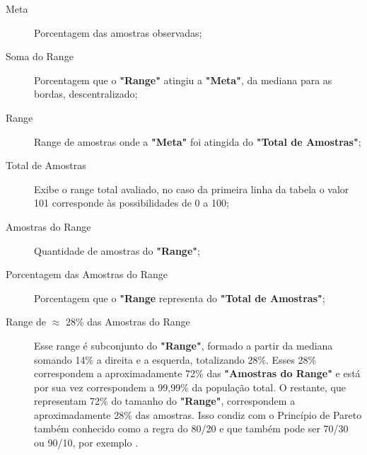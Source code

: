 \vspace{-8mm}
\begin{description}
   \item[Meta] Porcentagem das amostras observadas;
   \item[Soma do Range] Porcentagem que o \textbf{"Range"} atingiu a \textbf{"Meta"}, da mediana para as bordas, descentralizado;
   \item[Range] Range de amostras onde a \textbf{"Meta"} foi atingida do \textbf{"Total de Amostras"};
   \item[Total de Amostras] Exibe o range total avaliado, no caso da primeira linha da tabela o valor 101 corresponde às possibilidades de 0 a 100;
   \item[Amostras do Range] Quantidade de amostras do \textbf{"Range"};
   \item[Porcentagem das Amostras do Range] Porcentagem que o \textbf{"Range} representa do \textbf{"Total de Amostras"};
   \item[Range de $\approx$ 28\% das Amostras do Range] Esse range é  subconjunto do \textbf{"Range"}, formado a partir da mediana somando 14\% a direita e a esquerda, totalizando 28\%. Esses 28\% correspondem a aproximadamente 72\% das \textbf{"Amostras do Range"} e está por sua vez correspondem a 99,99\% da população total. O restante, que representam 72\% do tamanho do \textbf{"Range"}, correspondem a aproximadamente 28\% das amostras. Isso condiz com o Princípio de Pareto também conhecido como a regra do 80/20 e que também pode ser 70/30 ou 90/10, por exemplo \cite{wiki_pareto_principle}.
\end{description}
\bigbreak


